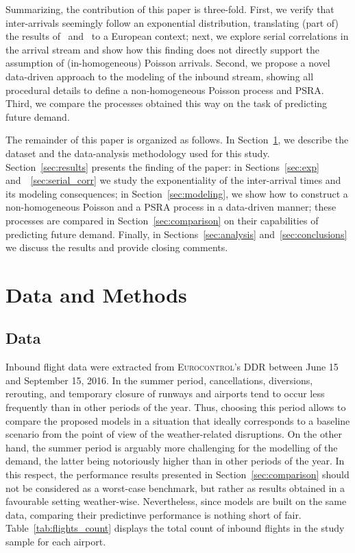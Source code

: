 \documentclass[final,review]{elsarticle}
\begin{document}
Summarizing, the contribution of this paper is three-fold.
First, we verify that inter-arrivals seemingly follow an exponential distribution, translating (part of) the results of~\cite{willemain2004statistical} and~\citep{gwiggner2014data} to a European context; next, we explore serial correlations in the arrival stream and show how this finding does not directly support the assumption of (in-homogeneous) Poisson arrivals. Second, we propose a novel data-driven approach to the modeling of the inbound stream, showing all procedural details to define a non-homogeneous Poisson process and \ac{PSRA}. Third, we compare the processes obtained this way on the task of predicting future demand.

The remainder of this paper is organized as follows.
In Section~\ref{sec:data_methods}, we describe the dataset and the data-analysis methodology used for this study.
Section~\ref{sec:results} presents the finding of the paper:
in Sections~\ref{sec:exp} and~~\ref{sec:serial_corr} we study the exponentiality of the inter-arrival times and its modeling consequences; in Section~\ref{sec:modeling}, we show how to construct a non-homogeneous Poisson and a \ac{PSRA} process in a data-driven manner; these processes are compared in Section~\ref{sec:comparison} on their capabilities of predicting future demand.
Finally, in Sections~\ref{sec:analysis} and~\ref{sec:conclusions} we discuss the results and provide closing comments.

\section{Data and Methods}\label{sec:data_methods}

\subsection{Data}\label{sec:dm_data}

Inbound flight data were extracted from \textsc{Eurocontrol}'s \ac{DDR} between June 15 and September 15, 2016.
In the summer period, cancellations, diversions, rerouting, and temporary closure of runways and airports tend to occur less frequently than in other periods of the year. Thus, choosing this period allows to compare the proposed models in a situation that ideally corresponds to a baseline scenario from the point of view of the weather-related disruptions.
On the other hand, the summer period is arguably more challenging for the modelling of the demand, the latter being notoriously higher than in other periods of the year.
In this respect, the performance results presented in Section~\ref{sec:comparison} should not be considered as a worst-case benchmark, but rather as results obtained in a favourable setting weather-wise. Nevertheless, since models are built on the same data, comparing their predictinve performance is nothing short of fair.
Table~\ref{tab:flights_count} displays the total count of inbound flights in the study sample for each airport.
\end{document}

